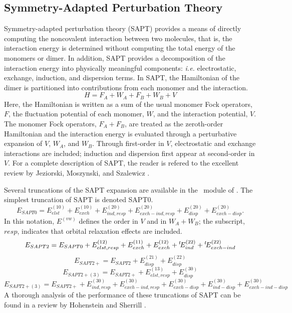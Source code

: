 \subsection{Symmetry-Adapted Perturbation Theory} \label{sapt}
\renewcommand{\optionname}[2]{\texttt{\nameref{op-#2-#1}}}

Symmetry-adapted perturbation theory (SAPT) provides a means of directly
computing the noncovalent interaction between two molecules, that is, the
interaction energy is determined without computing the total energy of the
monomers or dimer. In addition, SAPT provides a decomposition of the
interaction energy into physically meaningful components: {\em i.e.}
electrostatic, exchange, induction, and dispersion terms. In SAPT, the 
Hamiltonian of the dimer is partitioned into contributions from each 
monomer and the interaction.
\begin{equation}
H=F_A+W_A+F_B+W_B+V
\end{equation}
Here, the Hamiltonian is written as a sum of the usual monomer Fock
operators, $F$, the fluctuation potential of each monomer, $W$, and the
interaction potential, $V$. The monomer Fock operators, $F_A+F_B$, are
treated as the zeroth-order Hamiltonian and the interaction energy is
evaluated through a perturbative expansion of $V$, $W_A$, and $W_B$. 
Through first-order in $V$, electrostatic and exchange interactions are
included; induction and dispersion first appear at second-order in $V$. For
a complete description of SAPT, the reader is refered to the excellent
review by Jeziorski, Moszynski, and Szalewicz \cite{Jeziorski:1994:1887}.

Several truncations of the SAPT expansion are available in the \PSIsapt\
module of \PSIfour. The simplest truncation of SAPT is denoted SAPT0.
\begin{equation}
\label{eqn:SAPT0}
E_{SAPT0} = E_{elst}^{(10)} + E_{exch}^{(10)} + E_{ind,resp}^{(20)} +
E_{exch-ind,resp}^{(20)} + E_{disp}^{(20)} + E_{exch-disp}^{(20)}.
\end{equation}
In this notation, $E^{(vw)}$ defines the order in $V$ and in $W_A+W_B$; the
subscript, $resp$, indicates that orbital relaxation effects are included.
\begin{equation}
\label{eqn:SAPT2}
E_{SAPT2} = E_{SAPT0} + E_{elst,resp}^{(12)} + E_{exch}^{(11)} +
E_{exch}^{(12)} +\/ ^{t}\!E_{ind}^{(22)} +\/ ^{t}\!E_{exch-ind}^{(22)}
\end{equation}
\begin{equation}
\label{eqn:SAPT2+}
E_{SAPT2+} = E_{SAPT2} + E_{disp}^{(21)} + E_{disp}^{(22)}
\end{equation}
\begin{equation}
\label{eqn:SAPT2+p3}
E_{SAPT2+(3)} = E_{SAPT2+} + E_{elst,resp}^{(13)} + E_{disp}^{(30)}
\end{equation}
\begin{equation}
\label{eqn:SAPT2+3}
E_{SAPT2+(3)} = E_{SAPT2+} + E_{ind,resp}^{(30)} + E_{exch-ind,resp}^{(30)}
+ E_{exch-disp}^{(30)} + E_{ind-disp}^{(30)} + E_{exch-ind-disp}^{(30)}
\end{equation}
A thorough analysis of the performance of these truncations of SAPT can be
found in a review by Hohenstein and Sherrill \cite{Hohenstein:2012:WIREs}.

